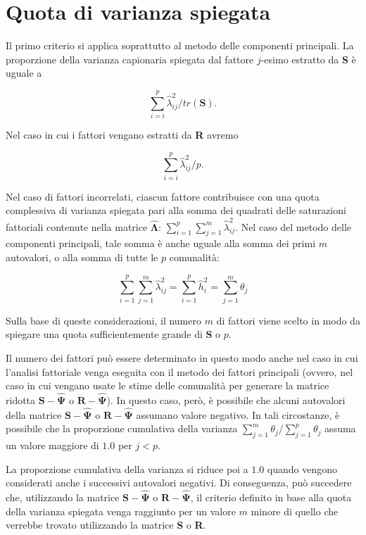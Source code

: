 \documentclass[
  11pt,
]{krantz}
\theoremstyle{definition}
\theoremstyle{definition}
\theoremstyle{definition}
\theoremstyle{definition}
\theoremstyle{remark}
\begin{document}
\hypertarget{quota-di-varianza-spiegata}{%
\section{Quota di varianza spiegata}\label{quota-di-varianza-spiegata}}

Il primo criterio si applica soprattutto al metodo delle componenti principali. La proporzione della varianza capionaria spiegata dal fattore \(j\)-esimo estratto da \textbf{S} è uguale a

\[\sum_{i=i}^p \hat{\lambda}_{ij}^2 / tr(\textbf{S}).\]

Nel caso in cui i fattori vengano estratti da \textbf{R} avremo

\[\sum_{i=i}^p \hat{\lambda}_{ij}^2 / p.\]

Nel caso di fattori incorrelati, ciascun fattore contribuisce con una quota complessiva di varianza spiegata pari alla somma dei quadrati delle saturazioni fattoriali contenute nella matrice \(\hat{\boldsymbol{\Lambda}}\): \(\sum_{i=1}^p\sum_{j=1}^m\hat{\lambda}_{ij}^2\). Nel caso del metodo delle componenti principali, tale somma è anche uguale alla somma dei primi \(m\) autovalori, o alla somma di tutte le \(p\) comunalità:

\[\sum_{i=1}^p\sum_{j=1}^m\hat{\lambda}_{ij}^2= \sum_{i=1}^p \hat{h}_i^2
= \sum_{j=1}^m \theta_j\]

Sulla base di queste considerazioni, il numero \(m\) di fattori viene scelto in modo da spiegare una quota sufficientemente grande di \textbf{S} o \(p\).

Il numero dei fattori può essere determinato in questo modo anche nel caso in cui l'analisi fattoriale venga eseguita con il metodo dei fattori principali (ovvero, nel caso in cui vengano usate le stime delle comunalità per generare la matrice ridotta \(\textbf{S} - \hat{\boldsymbol{\Psi}}\) o \(\textbf{R} - \hat{\boldsymbol{\Psi}}\)). In questo caso, però, è possibile che alcuni autovalori della matrice \(\textbf{S} - \hat{\boldsymbol{\Psi}}\) o \(\textbf{R} - \hat{\boldsymbol{\Psi}}\) assumano valore negativo. In tali circostanze, è possibile che la proporzione cumulativa della varianza \(\sum_{j=1}^m \theta_j / \sum_{j=1}^p \theta_j\) assuma un valore maggiore di \(1.0\) per \(j < p\).

La proporzione cumulativa della varianza si riduce poi a \(1.0\) quando vengono considerati anche i successivi autovalori negativi. Di conseguenza, può succedere che, utilizzando la matrice \(\textbf{S} - \hat{\boldsymbol{\Psi}}\) o \(\textbf{R} - \hat{\boldsymbol{\Psi}}\), il criterio definito in base alla quota della varianza spiegata venga raggiunto per un valore \(m\) minore di quello che verrebbe trovato utilizzando la matrice \textbf{S} o \textbf{R}.
\end{document}
